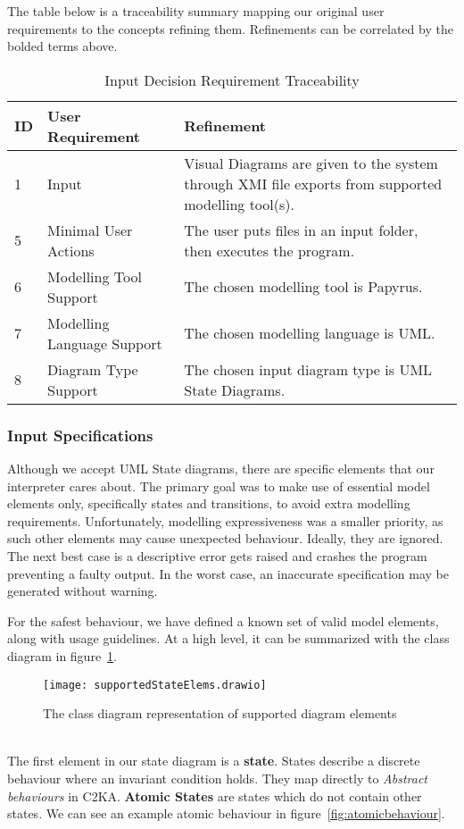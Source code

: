 The table below is a traceability summary mapping our original user requirements to the concepts refining them.
Refinements can be correlated by the bolded terms above.

\begin{table}[htbp]
\centering
\caption{Input Decision Requirement Traceability}\label{tab:input-table}
\begin{tabularx}{\textwidth}{| l | l | X |}
    \hline
    \textbf{ID} & \textbf{User Requirement} & \textbf{Refinement} \\
    \hline
    1 & Input & Visual Diagrams are given to the system through XMI file exports from supported modelling tool(s). \\ \hline
    5 & Minimal User Actions & The user puts files in an input folder, then executes the program.  \\ \hline
    6 & Modelling Tool Support & The chosen modelling tool is Papyrus. \\ \hline
    7 & Modelling Language Support & The chosen modelling language is UML. \\ \hline
    8 & Diagram Type Support & The chosen input diagram type is UML State Diagrams. \\ \hline
\end{tabularx}
\end{table}

\newpage
\subsubsection{Input Specifications}\label{subsubsec:input-specification}
Although we accept UML State diagrams, there are specific elements that our interpreter cares about.
The primary goal was to make use of essential model elements only, specifically states and transitions,
to avoid extra modelling requirements.
Unfortunately, modelling expressiveness was a smaller priority, as such
other elements may cause unexpected behaviour.
Ideally, they are ignored.
The next best case is a descriptive error gets raised and crashes the program preventing a faulty output.
In the worst case, an inaccurate specification may be generated without warning.

For the safest behaviour, we have defined a known set of valid model elements, along with usage guidelines.
At a high level, it can be summarized with the class diagram in figure~\ref{fig:supportedElems}.
\begin{figure}[ht]
          \centering
          \texttt{[image: supportedStateElems.drawio]}
          \caption{The class diagram representation of supported diagram elements}
          \label{fig:supportedElems}
\end{figure}
\\
The first element in our state diagram is a \textbf{state}.
States describe a discrete behaviour where an invariant condition holds.
They map directly to \textit{Abstract behaviours} in C2KA\@.
\textbf{Atomic States} are states which do not contain other states.
We can see an example atomic behaviour in figure~\ref{fig:atomicbehaviour}.


